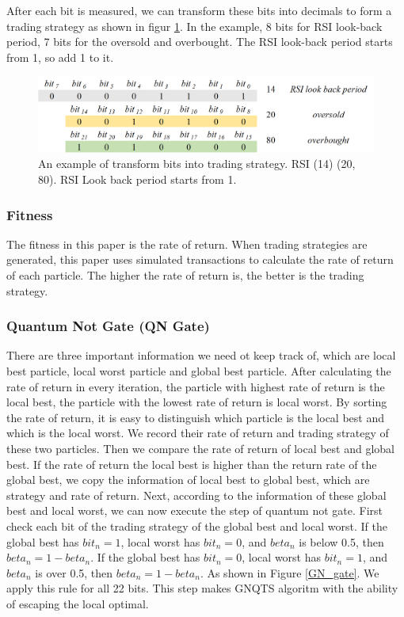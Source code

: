 \documentclass[../main.tex]{subfiles}
\begin{document}
\bigbreak

After each bit is measured, we can transform these bits into decimals to form a trading strategy as shown in figur \ref{form_strategy}. In the example, 8 bits for RSI look-back period, 7 bits for the oversold and overbought. The RSI look-back period starts from 1, so add 1 to it.

\begin{figure}[H]
    \centering
    \includegraphics[scale = 0.5] {figure/form_strategy.png}
    \caption{An example of transform bits into trading strategy. RSI (14) (20, 80).
        RSI Look back period starts from 1.}
    \label{form_strategy}
\end{figure}

\subsubsection{Fitness}

The fitness in this paper is the rate of return. When trading strategies are generated, this paper uses simulated transactions to calculate the rate of return of each particle. The higher the rate of return is, the better is the trading strategy.

\subsubsection{Quantum Not Gate (QN Gate)}

There are three important information we need ot keep track of, which are local best particle, local worst particle and global best particle.  After calculating the rate of return in every iteration, the particle with highest rate of return is the local best, the particle with the lowest rate of return is local worst. By sorting the rate of return, it is easy to distinguish which particle is the local best and which is the local worst. We record their rate of return and trading strategy of these two particles. Then we compare the rate of return of local best and global best. If the rate of return the local best is higher than the return rate of the global best, we copy the information of local best to global best, which are strategy and rate of return. Next, according to the information of these global best and local worst, we can now execute the step of quantum not gate. First check each bit of the trading strategy of the global best and local worst.  If the global best has $bit_n = 1$, local worst has $bit_n = 0$, and $beta_n$ is below 0.5, then $beta_n = 1- beta_n$. If the global best has $bit_n = 0$, local worst has $bit_n = 1$, and $beta_n$ is over 0.5, then $beta_n = 1- beta_n$. As shown in Figure \ref{GN_gate}. We apply this rule for all 22 bits. This step makes GNQTS algoritm with the ability of escaping the local optimal.
\end{document}
